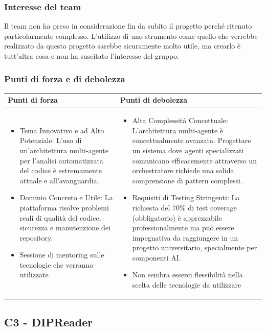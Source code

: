 \documentclass[a4paper,11pt]{article}
\begin{document}
\subsubsection{Interesse del team}
Il team non ha preso in considerazione fin da subito il progetto perché ritenuto particolarmente complesso. L'utilizzo di uno strumento come quello che verrebbe realizzato da questo progetto sarebbe sicuramente molto utile, ma crearlo è tutt'altra cosa e non ha suscitato l'interesse del gruppo.
\subsubsection{Punti di forza e di debolezza}
{\footnotesize
\begin{tabularx}{\textwidth}{|X|X|}
\hline
\rowcolor{lightgray!40} %
\textbf{Punti di forza} & \textbf{Punti di debolezza} \\
\hline
\begin{itemize}
\item Tema Innovativo e ad Alto Potenziale: L'uso di un'architettura multi-agente per l'analisi automatizzata del codice è estremamente attuale e all'avanguardia.
\item Dominio Concreto e Utile: La piattaforma risolve problemi reali di qualità del codice, sicurezza e manutenzione dei repository. 
\item Sessione di mentoring sulle tecnologie che verranno utilizzate
\end{itemize}
 & \begin{itemize}
\item Alta Complessità Concettuale: L'architettura multi-agente è concettualmente avanzata. Progettare un sistema dove agenti specializzati comunicano efficacemente attraverso un orchestratore richiede una solida comprensione di pattern complessi.
\item  Requisiti di Testing Stringenti: La richiesta del 70\% di test coverage (obbligatorio) è apprezzabile professionalmente ma può essere impegnativa da raggiungere in un progetto universitario, specialmente per componenti AI.
\item Non sembra esserci flessibilità nella scelta delle tecnologie da utilizzare
\end{itemize} \\
\hline
\end{tabularx}
}

\newpage
\subsection{C3 - DIPReader}
\end{document}
